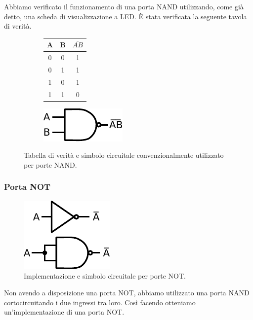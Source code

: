 Abbiamo verificato il funzionamento di una porta NAND utilizzando, come già detto, una scheda di visualizzazione a LED.
È stata verificata la seguente tavola di verità.\\

\begin{figure}[htpc]
\centering
	\begin{subfigure}[hc]{.4\textwidth}
		\centering
		{\renewcommand{\arraystretch}{1.2}%
		\begin{tabular}{|c|c|c|}
		\hline
		A & B & $\overline{AB}$ \\
		\hline
		0 & 0 & 1\\
		\hline
		0 & 1 & 1\\
		\hline
		1 & 0 & 1\\
		\hline
		1 & 1 & 0\\
		\hline
		\end{tabular}}
		\label{tab9:NAND}
        \end{subfigure}
        \begin{subfigure}[hc]{.4\textwidth}
		\centering
		\includegraphics[width=.35\textwidth]{../E09/latex/NAND.pdf}
		\label{cir9:nand}
        \end{subfigure}
\caption{Tabella di verità e simbolo circuitale convenzionalmente utilizzato per porte NAND.}
\end{figure}
\vspace{-5mm}

\subsubsection{Porta NOT}

\begin{figure}
\centering
\includegraphics[width=.16\textwidth]{../E09/latex/NOT.pdf}
\caption{Implementazione e simbolo circuitale per porte NOT.}
\label{cir9:not}
\end{figure}

Non avendo a disposizione una porta NOT, abbiamo utilizzato una porta NAND cortocircuitando i due ingressi tra loro.
Così facendo otteniamo un'implementazione di una porta NOT.

